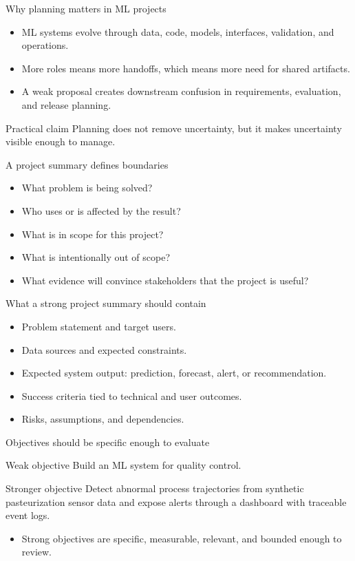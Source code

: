 \begin{frame}{Why planning matters in ML projects}
\begin{itemize}
\item ML systems evolve through data, code, models, interfaces, validation, and operations.
\item More roles means more handoffs, which means more need for shared artifacts.
\item A weak proposal creates downstream confusion in requirements, evaluation, and release planning.
\end{itemize}
\begin{block}{Practical claim}
Planning does not remove uncertainty, but it makes uncertainty visible enough to manage.
\end{block}
\coursefooter
\end{frame}

\begin{frame}{A project summary defines boundaries}
\begin{itemize}
\item What problem is being solved?
\item Who uses or is affected by the result?
\item What is in scope for this project?
\item What is intentionally out of scope?
\item What evidence will convince stakeholders that the project is useful?
\end{itemize}
\coursefooter
\end{frame}

\begin{frame}{What a strong project summary should contain}
\begin{itemize}
\item Problem statement and target users.
\item Data sources and expected constraints.
\item Expected system output: prediction, forecast, alert, or recommendation.
\item Success criteria tied to technical and user outcomes.
\item Risks, assumptions, and dependencies.
\end{itemize}
\coursefooter
\end{frame}

\begin{frame}{Objectives should be specific enough to evaluate}
\begin{block}{Weak objective}
Build an ML system for quality control.
\end{block}
\begin{block}{Stronger objective}
Detect abnormal process trajectories from synthetic pasteurization sensor data and expose alerts through a dashboard with traceable event logs.
\end{block}
\begin{itemize}
\item Strong objectives are specific, measurable, relevant, and bounded enough to review.
\end{itemize}
\coursefooter
\end{frame}


